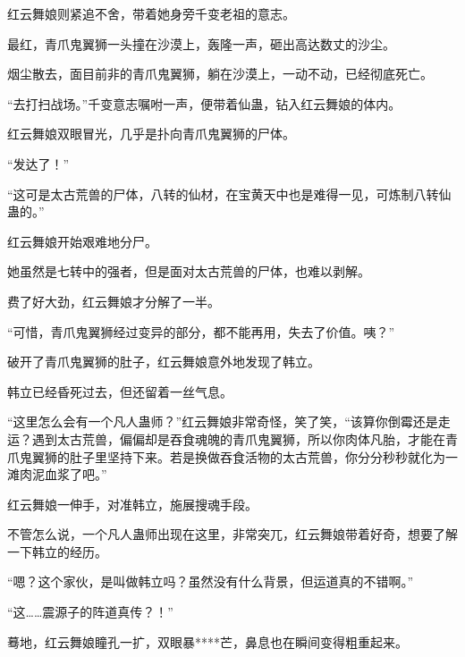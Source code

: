 \begin{this_body}
红云舞娘则紧追不舍，带着她身旁千变老祖的意志。

最红，青爪鬼翼狮一头撞在沙漠上，轰隆一声，砸出高达数丈的沙尘。

烟尘散去，面目前非的青爪鬼翼狮，躺在沙漠上，一动不动，已经彻底死亡。

“去打扫战场。”千变意志嘱咐一声，便带着仙蛊，钻入红云舞娘的体内。

红云舞娘双眼冒光，几乎是扑向青爪鬼翼狮的尸体。

“发达了！”

“这可是太古荒兽的尸体，八转的仙材，在宝黄天中也是难得一见，可炼制八转仙蛊的。”

红云舞娘开始艰难地分尸。

她虽然是七转中的强者，但是面对太古荒兽的尸体，也难以剥解。

费了好大劲，红云舞娘才分解了一半。

“可惜，青爪鬼翼狮经过变异的部分，都不能再用，失去了价值。咦？”

破开了青爪鬼翼狮的肚子，红云舞娘意外地发现了韩立。

韩立已经昏死过去，但还留着一丝气息。

“这里怎么会有一个凡人蛊师？”红云舞娘非常奇怪，笑了笑，“该算你倒霉还是走运？遇到太古荒兽，偏偏却是吞食魂魄的青爪鬼翼狮，所以你肉体凡胎，才能在青爪鬼翼狮的肚子里坚持下来。若是换做吞食活物的太古荒兽，你分分秒秒就化为一滩肉泥血浆了吧。”

红云舞娘一伸手，对准韩立，施展搜魂手段。

不管怎么说，一个凡人蛊师出现在这里，非常突兀，红云舞娘带着好奇，想要了解一下韩立的经历。

“嗯？这个家伙，是叫做韩立吗？虽然没有什么背景，但运道真的不错啊。”

“这……震源子的阵道真传？！”

蓦地，红云舞娘瞳孔一扩，双眼暴****芒，鼻息也在瞬间变得粗重起来。

\end{this_body}

